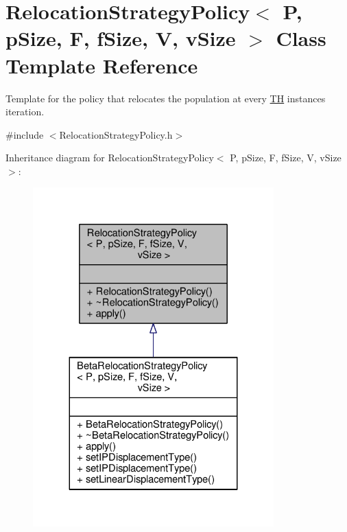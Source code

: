 \hypertarget{classRelocationStrategyPolicy}{}\section{Relocation\+Strategy\+Policy$<$ P, p\+Size, F, f\+Size, V, v\+Size $>$ Class Template Reference}
\label{classRelocationStrategyPolicy}


Template for the policy that relocates the population at every \hyperlink{classTH}{TH} instance\textquotesingle{}s iteration.  




{\ttfamily \#include $<$Relocation\+Strategy\+Policy.\+h$>$}



Inheritance diagram for Relocation\+Strategy\+Policy$<$ P, p\+Size, F, f\+Size, V, v\+Size $>$\+:
\nopagebreak
\begin{figure}[H]
\begin{center}
\leavevmode
\includegraphics[width=263pt]{classRelocationStrategyPolicy__inherit__graph}
\end{center}
\end{figure}


